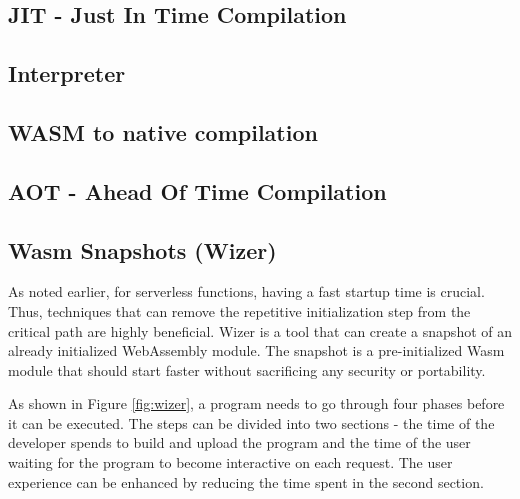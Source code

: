\subsection{JIT - Just In Time Compilation}
\label{sec:jit}

\subsection{Interpreter}
\label{sec:interpreter}

\subsection{WASM to native compilation}
\label{sec:wasm-to-native}

\subsection{AOT - Ahead Of Time Compilation}
\label{sec:aot}


\subsection{Wasm Snapshots (Wizer)}
\label{sec:wizer}

As noted earlier, for serverless functions, having a fast startup time is crucial. 
Thus, techniques that can remove the repetitive initialization step from the critical 
path are highly beneficial. Wizer is a tool that can create a snapshot of an already 
initialized WebAssembly module. The snapshot is a pre-initialized Wasm module that should start 
faster without sacrificing any security or portability. 

As shown in Figure \ref{fig:wizer}, a program needs to go through four phases before it can be executed. 
The steps can be divided into two sections - the time of the developer spends to build and upload the program and the time of the user waiting for the program to become interactive on each request. The user experience can be enhanced by reducing the time spent in the second section. 


